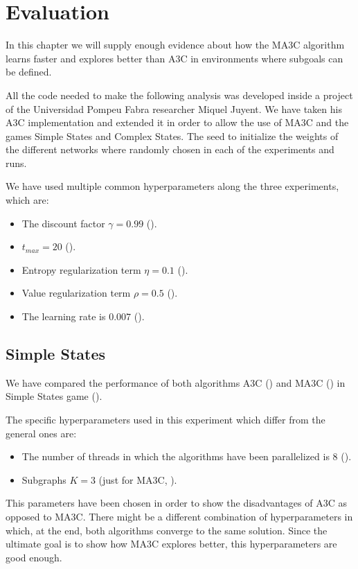 \chapter{Evaluation}

In this chapter we will supply enough evidence about how the \ac{MA3C} algorithm learns faster and explores better than
\ac{A3C} in environments where subgoals can be defined.

All the code needed to make the following analysis was developed inside a project of the Universidad Pompeu Fabra researcher
Miquel Juyent.
We have taken his \ac{A3C} implementation and extended it in order to allow the use of \ac{MA3C} and the games
Simple States and Complex States.
The seed to initialize the weights of the different networks where randomly chosen in each of the experiments and runs.

We have used multiple common hyperparameters along the three experiments, which are:
\begin{itemize}
    \item The discount factor $\gamma = 0.99$ ().
    \item $t_{max}=20$ ().
    \item Entropy regularization term $\eta = 0.1$ ().
    \item Value regularization term $ \rho = 0.5$ ().
    \item The learning rate is $0.007$ ().
\end{itemize}

\section{Simple States}

We have compared the performance of both algorithms \ac{A3C} () and \ac{MA3C} () in Simple
States game ().

The specific hyperparameters used in this experiment which differ from the general ones are:
\begin{itemize}
    \item The number of threads in which the algorithms have been parallelized is $8$ ().
    \item Subgraphs $K = 3$ (just for \ac{MA3C}, ).
\end{itemize}


This parameters have been chosen in order to show the disadvantages of \ac{A3C} as opposed to \ac{MA3C}.
There might be a different combination of hyperparameters in which, at the end, both algorithms converge to the same solution.
Since the ultimate goal is to show how \ac{MA3C} explores better, this hyperparameters are good enough.

